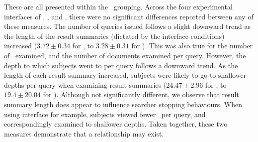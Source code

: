 These are all presented within the ~grouping. Across the four experimental interfaces of , ,  and , there were no significant differences reported between any of these measures. The number of queries issued follows a slight downward trend as the length of the result summaries (dictated by the interface conditions) increased ($3.72 \pm 0.34$ for , to $3.28\pm0.31$ for ). This was also true for the number of~ examined, and the number of documents examined per query. However, the depth to which subjects went to per query follows a downward trend. As the length of each result summary increased, subjects were likely to go to shallower depths per query when examining result summaries ($24.47\pm2.96$ for , to $19.4\pm20.04$ for ). Although not significantly different, we observe that result summary length does appear to influence searcher stopping behaviours. When using interface  for example, subjects viewed fewer~ per query, and correspondingly examined to shallower depths. Taken together, these two measures demonstrate that a relationship may exist.


